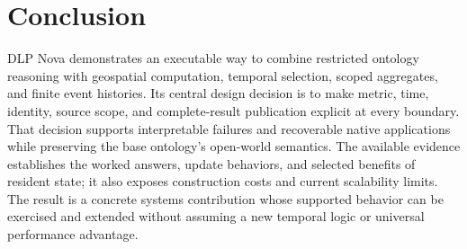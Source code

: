 \documentclass{article}
\begin{document}
\section{Conclusion}
DLP Nova demonstrates an executable way to combine restricted ontology
reasoning with geospatial computation, temporal selection, scoped aggregates,
and finite event histories. Its central design decision is to make metric,
time, identity, source scope, and complete-result publication explicit at every
boundary. That decision supports interpretable failures and recoverable native
applications while preserving the base ontology's open-world semantics.
The available evidence establishes the worked answers, update behaviors, and
selected benefits of resident state; it also exposes construction costs and
current scalability limits. The result is a concrete systems contribution
whose supported behavior can be exercised and extended without assuming a
new temporal logic or universal performance advantage.



\end{document}
